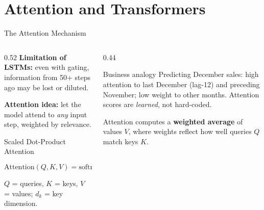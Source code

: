 \documentclass[aspectratio=169, 11pt]{beamer}
\begin{document}
\section{Attention and Transformers}


\begin{frame}{The Attention Mechanism}
  \begin{columns}[T]
    \begin{column}{0.52\textwidth}
      \textbf{Limitation of LSTMs:} even with gating,
      information from 50+ steps ago may be lost or diluted.

      \vspace{0.05cm}
      \textbf{Attention idea:} let the model attend to
      \emph{any} input step, weighted by relevance.

      \begin{definitionbox}{Scaled Dot-Product Attention \parencite{Vaswani2017}}
        \[
          \text{Attention}(Q,K,V) = \text{softmax}\!\left(\frac{QK^\top}{\sqrt{d_k}}\right)V
        \]
        $Q$ = queries, $K$ = keys, $V$ = values; $d_k$ = key dimension.
      \end{definitionbox}
    \end{column}
    \begin{column}{0.44\textwidth}
      \begin{examplebox}{Business analogy}
        \small
        Predicting December sales: high attention to last December
        (lag-12) and preceding November; low weight to other months.
        Attention scores are \emph{learned}, not hard-coded.
      \end{examplebox}
      \vspace{0.1cm}
      \begin{keybox}
        \small Attention computes a \textbf{weighted average}
        of values $V$, where weights reflect how well
        queries $Q$ match keys $K$.
      \end{keybox}
    \end{column}
  \end{columns}
\end{frame}
\end{document}
